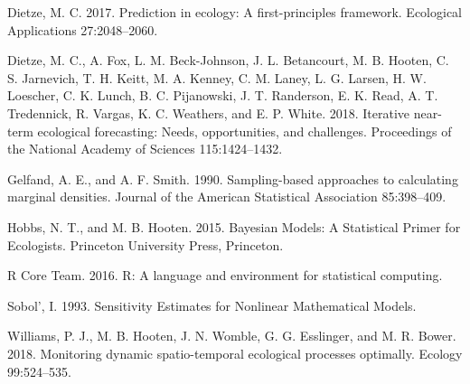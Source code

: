 \documentclass[12pt,]{article}
\begin{document}
\leavevmode\hypertarget{ref-Dietze2017a}{}%
Dietze, M. C. 2017. Prediction in ecology: A first-principles framework.
Ecological Applications 27:2048--2060.

\leavevmode\hypertarget{ref-Dietze2018}{}%
Dietze, M. C., A. Fox, L. M. Beck-Johnson, J. L. Betancourt, M. B.
Hooten, C. S. Jarnevich, T. H. Keitt, M. A. Kenney, C. M. Laney, L. G.
Larsen, H. W. Loescher, C. K. Lunch, B. C. Pijanowski, J. T. Randerson,
E. K. Read, A. T. Tredennick, R. Vargas, K. C. Weathers, and E. P.
White. 2018. Iterative near-term ecological forecasting: Needs,
opportunities, and challenges. Proceedings of the National Academy of
Sciences 115:1424--1432.

\leavevmode\hypertarget{ref-Gelfand1990}{}%
Gelfand, A. E., and A. F. Smith. 1990. Sampling-based approaches to
calculating marginal densities. Journal of the American Statistical
Association 85:398--409.

\leavevmode\hypertarget{ref-Hobbs2015}{}%
Hobbs, N. T., and M. B. Hooten. 2015. Bayesian Models: A Statistical
Primer for Ecologists. Princeton University Press, Princeton.

\leavevmode\hypertarget{ref-R2016}{}%
R Core Team. 2016. R: A language and environment for statistical
computing.

\leavevmode\hypertarget{ref-Sobol1993}{}%
Sobol', I. 1993. Sensitivity Estimates for Nonlinear Mathematical
Models.

\leavevmode\hypertarget{ref-Williams2018}{}%
Williams, P. J., M. B. Hooten, J. N. Womble, G. G. Esslinger, and M. R.
Bower. 2018. Monitoring dynamic spatio-temporal ecological processes
optimally. Ecology 99:524--535.
\end{document}
